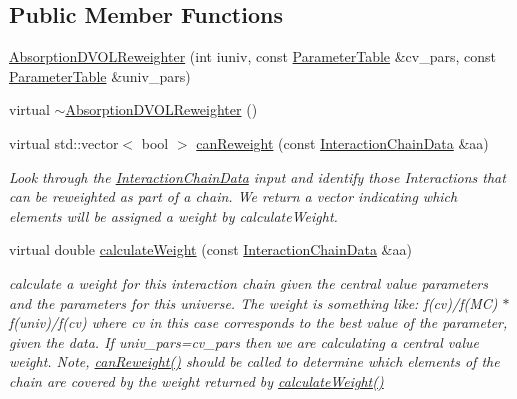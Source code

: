 \subsection*{Public Member Functions}
\begin{DoxyCompactItemize}
\item 
\hyperlink{class_neutrino_flux_reweight_1_1_absorption_d_v_o_l_reweighter_a3f1c98354cf75e8cc3cea7c448a45989}{Absorption\-D\-V\-O\-L\-Reweighter} (int iuniv, const \hyperlink{class_neutrino_flux_reweight_1_1_parameter_table}{Parameter\-Table} \&cv\-\_\-pars, const \hyperlink{class_neutrino_flux_reweight_1_1_parameter_table}{Parameter\-Table} \&univ\-\_\-pars)
\item 
virtual \hyperlink{class_neutrino_flux_reweight_1_1_absorption_d_v_o_l_reweighter_a93d545e92ac458cb407ce7e219b942c2}{$\sim$\-Absorption\-D\-V\-O\-L\-Reweighter} ()
\item 
virtual std\-::vector$<$ bool $>$ \hyperlink{class_neutrino_flux_reweight_1_1_absorption_d_v_o_l_reweighter_a4431fee76a4b04a42dac9f6be83f6346}{can\-Reweight} (const \hyperlink{class_neutrino_flux_reweight_1_1_interaction_chain_data}{Interaction\-Chain\-Data} \&aa)
\begin{DoxyCompactList}\small\item\em Look through the \hyperlink{class_neutrino_flux_reweight_1_1_interaction_chain_data}{Interaction\-Chain\-Data} input and identify those Interactions that can be reweighted as part of a chain. We return a vector indicating which elements will be assigned a weight by calculate\-Weight. \end{DoxyCompactList}\item 
virtual double \hyperlink{class_neutrino_flux_reweight_1_1_absorption_d_v_o_l_reweighter_abe4d5b881334283ded041e46d2613608}{calculate\-Weight} (const \hyperlink{class_neutrino_flux_reweight_1_1_interaction_chain_data}{Interaction\-Chain\-Data} \&aa)
\begin{DoxyCompactList}\small\item\em calculate a weight for this interaction chain given the central value parameters and the parameters for this universe. The weight is something like\-: f(cv)/f(M\-C) $\ast$ f(univ)/f(cv) where cv in this case corresponds to the best value of the parameter, given the data. If univ\-\_\-pars=cv\-\_\-pars then we are calculating a central value weight. Note, \hyperlink{class_neutrino_flux_reweight_1_1_absorption_d_v_o_l_reweighter_a4431fee76a4b04a42dac9f6be83f6346}{can\-Reweight()} should be called to determine which elements of the chain are covered by the weight returned by \hyperlink{class_neutrino_flux_reweight_1_1_absorption_d_v_o_l_reweighter_abe4d5b881334283ded041e46d2613608}{calculate\-Weight()} \end{DoxyCompactList}\end{DoxyCompactItemize}
